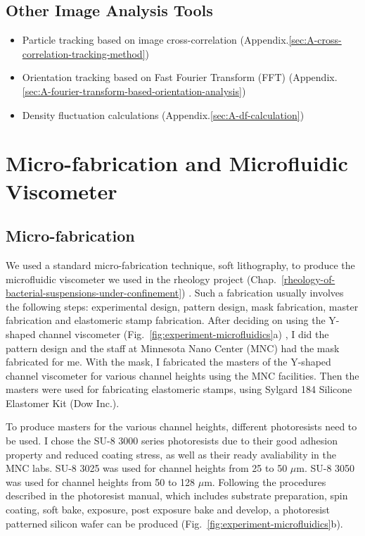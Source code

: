 \subsection{Other Image Analysis Tools}

\begin{itemize}
	\item Particle tracking based on image cross-correlation (Appendix.\ref{sec:A-cross-correlation-tracking-method})
	\item Orientation tracking based on Fast Fourier Transform (FFT) (Appendix.\ref{sec:A-fourier-transform-based-orientation-analysis})
	\item Density fluctuation calculations (Appendix.\ref{sec:A-df-calculation})
\end{itemize}


\section{Micro-fabrication and Microfluidic Viscometer}
\label{micro-fabrication-and-microfluidics}

\subsection{Micro-fabrication}

We used a standard micro-fabrication technique, soft lithography, to produce the microfluidic viscometer we used in the rheology project (Chap.~\ref{rheology-of-bacterial-suspensions-under-confinement}) \cite{Qin2010}. Such a fabrication usually involves the following steps: experimental design, pattern design, mask fabrication, master fabrication and elastomeric stamp fabrication.
After deciding on using the Y-shaped channel viscometer (Fig.~\ref{fig:experiment-microfluidics}a) \cite{Gachelin2013}, I did the pattern design and the staff at Minnesota Nano Center (MNC) had the mask fabricated for me. With the mask, I fabricated the masters of the Y-shaped channel viscometer for various channel heights using the MNC facilities. Then the masters were used for fabricating elastomeric stamps, using Sylgard 184 Silicone Elastomer Kit (Dow Inc.).

To produce masters for the various channel heights, different photoresists need to be used. I chose the SU-8 3000 series photoresists due to their good adhesion property and reduced coating stress, as well as their ready avaliability in the MNC labs. SU-8 3025 was used for channel heights from 25 to 50 $\mu$m. SU-8 3050 was used for channel heights from 50 to 128 $\mu$m. Following the procedures described in the photoresist manual, which includes substrate preparation, spin coating, soft bake, exposure, post exposure bake and develop, a photoresist patterned silicon wafer can be produced (Fig.~\ref{fig:experiment-microfluidics}b).

